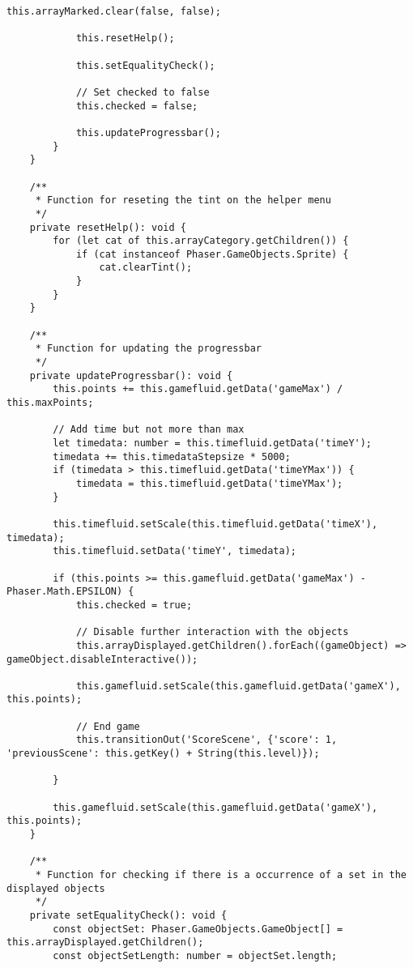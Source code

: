 \begin{lstlisting}[style=TypeScript, caption={gameScene.ts}]
            this.arrayMarked.clear(false, false);

            this.resetHelp();

            this.setEqualityCheck();

            // Set checked to false
            this.checked = false;

            this.updateProgressbar();
        }
    }

    /**
     * Function for reseting the tint on the helper menu
     */
    private resetHelp(): void {
        for (let cat of this.arrayCategory.getChildren()) {
            if (cat instanceof Phaser.GameObjects.Sprite) {
                cat.clearTint();
            }
        }
    }

    /**
     * Function for updating the progressbar
     */
    private updateProgressbar(): void {
        this.points += this.gamefluid.getData('gameMax') / this.maxPoints;

        // Add time but not more than max
        let timedata: number = this.timefluid.getData('timeY');
        timedata += this.timedataStepsize * 5000;
        if (timedata > this.timefluid.getData('timeYMax')) {
            timedata = this.timefluid.getData('timeYMax');
        }

        this.timefluid.setScale(this.timefluid.getData('timeX'), timedata);
        this.timefluid.setData('timeY', timedata);

        if (this.points >= this.gamefluid.getData('gameMax') - Phaser.Math.EPSILON) {
            this.checked = true;

            // Disable further interaction with the objects
            this.arrayDisplayed.getChildren().forEach((gameObject) => gameObject.disableInteractive());

            this.gamefluid.setScale(this.gamefluid.getData('gameX'), this.points);

            // End game
            this.transitionOut('ScoreScene', {'score': 1, 'previousScene': this.getKey() + String(this.level)});

        }

        this.gamefluid.setScale(this.gamefluid.getData('gameX'), this.points);
    }

    /**
     * Function for checking if there is a occurrence of a set in the displayed objects
     */
    private setEqualityCheck(): void {
        const objectSet: Phaser.GameObjects.GameObject[] = this.arrayDisplayed.getChildren();
        const objectSetLength: number = objectSet.length;


\end{lstlisting}
